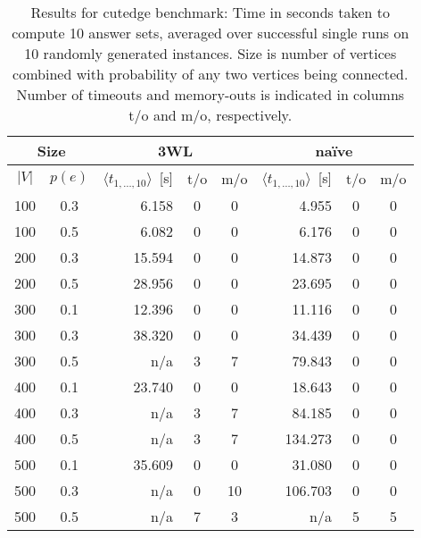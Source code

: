\documentclass{vutinfth} %
\begin{document}
\begin{table}
\begin{center}
	\begin{tabular}{|cc||rcc|rcc|}
\hline
\multicolumn{2}{|c||}{Size} & \multicolumn{3}{c|}{3WL} & \multicolumn{3}{c|}{na\"{i}ve} \\
\hline
$|V|$ & $p(e)$& $\langle t_{1, \ldots, 10} \rangle$~[s]&t/o&m/o& $\langle t_{1, \ldots, 10} \rangle$~[s]&t/o&m/o\\
\hline
\hline
100 & 0.3 & 	  6.158 & 0 &  0 &	  4.955 & 0 & 0 \\
100 & 0.5 & 	  6.082 & 0 &  0 &	  6.176 & 0 & 0 \\
200 & 0.3 & 	 15.594 & 0 &  0 &	 14.873 & 0 & 0 \\
200 & 0.5 & 	 28.956 & 0 &  0 &	 23.695 & 0 & 0 \\
300 & 0.1 & 	 12.396 & 0 &  0 &	 11.116 & 0 & 0 \\
300 & 0.3 & 	 38.320 & 0 &  0 &	 34.439 & 0 & 0 \\
300 & 0.5 & 	    n/a & 3 &  7 &	 79.843 & 0 & 0 \\
400 & 0.1 & 	 23.740 & 0 &  0 &	 18.643 & 0 & 0 \\
400 & 0.3 & 	    n/a & 3 &  7 &	 84.185 & 0 & 0 \\
400 & 0.5 & 	    n/a & 3 &  7 &	134.273 & 0 & 0 \\
500 & 0.1 & 	 35.609 & 0 &  0 &	 31.080 & 0 & 0 \\
500 & 0.3 & 	    n/a & 0 & 10 &	106.703 & 0 & 0 \\
500 & 0.5 & 	    n/a & 7 &  3 &	    n/a & 5 & 5 \\
\hline
	\end{tabular}
	\end{center}
	
	\caption[Results for cutedge benchmark]{Results for cutedge benchmark: Time in seconds taken to compute 10 answer sets, averaged over successful single runs on 10 randomly generated instances. Size is number of vertices combined with probability of any two vertices being connected. Number of timeouts and memory-outs is indicated in columns t/o and m/o, respectively.}
	\label{tbl:cut}
\end{table}
\end{document}
